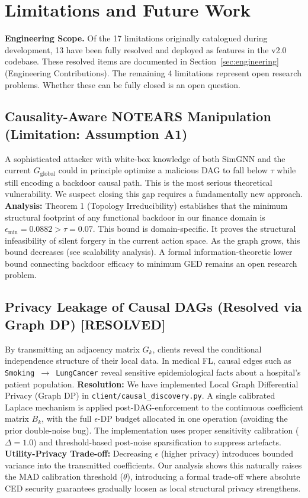 \documentclass[journal]{IEEEtran}
\begin{document}
\section{Limitations and Future Work}\label{sec:limitations}

\textbf{Engineering Scope.} Of the 17 limitations originally catalogued during development, 13 have been fully resolved and deployed as features in the v2.0 codebase. These resolved items are documented in Section~\ref{sec:engineering} (Engineering Contributions). The remaining 4 limitations represent open research problems. Whether these can be fully closed is an open question.

\subsection{Causality-Aware NOTEARS Manipulation (Limitation: Assumption A1)}
A sophisticated attacker with white-box knowledge of both SimGNN and the current $G_{\text{global}}$ could in principle optimize a malicious DAG to fall below $\tau$ while still encoding a backdoor causal path. This is the most serious theoretical vulnerability. We suspect closing this gap requires a fundamentally new approach. \textbf{Analysis:} Theorem 1 (Topology Irreducibility) establishes that the minimum structural footprint of any functional backdoor in our finance domain is $\epsilon_{\text{min}} = 0.0882 > \tau = 0.07$. This bound is domain-specific. It proves the structural infeasibility of silent forgery in the current action space. As the graph grows, this bound decreases (see scalability analysis). A formal information-theoretic lower bound connecting backdoor efficacy to minimum GED remains an open research problem.

\subsection{Privacy Leakage of Causal DAGs (Resolved via Graph DP) \textbf{[RESOLVED]}}
By transmitting an adjacency matrix $G_k$, clients reveal the conditional independence structure of their local data. In medical FL, causal edges such as \texttt{Smoking $\to$ LungCancer} reveal sensitive epidemiological facts about a hospital's patient population. \textbf{Resolution:} We have implemented Local Graph Differential Privacy (Graph DP) in \texttt{client/causal\_discovery.py}. A single calibrated Laplace mechanism is applied post-DAG-enforcement to the continuous coefficient matrix $B_k$, with the full $\epsilon$-DP budget allocated in one operation (avoiding the prior double-noise bug). The implementation uses proper sensitivity calibration ($\Delta = 1.0$) and threshold-based post-noise sparsification to suppress artefacts. \textbf{Utility-Privacy Trade-off:} Decreasing $\epsilon$ (higher privacy) introduces bounded variance into the transmitted coefficients. Our analysis shows this naturally raises the MAD calibration threshold ($\theta$), introducing a formal trade-off where absolute CED security guarantees gradually loosen as local structural privacy strengthens.
\end{document}
